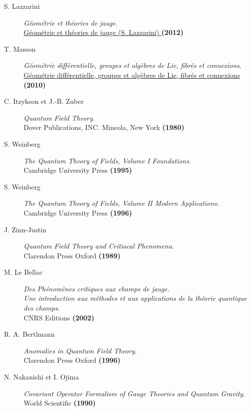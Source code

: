 \documentclass[a4paper,11pt]{article}
\theoremstyle{plain}
\theoremstyle{definition}
\theoremstyle{remark}
\numberwithin{equation}{section}
\numberwithin{equation}{subsection}
\numberwithin{figure}{section}
\begin{document}
\begin{description}

\item[S. Lazzarini]\emph{Géométrie et théories de jauge}. \\
\href{http://marwww.in2p3.fr/Master_M2_P3TMA_Physique_Theorique_et_Mathematique_Physique_des_Particules_
et_Astrophysique/Programme/Specialites/GeoTheoriedeJauge.html}{Géométrie et théories de jauge (S. Lazzarini) }  \textbf{(2012)}

\item[T. Masson]\emph{Géométrie différentielle, groupes et algèbres de Lie, fibrés et connexions}. \\
\href{http://science.thilucmic.fr/spip.php?article12}{Géométrie différentielle, groupes et algèbres de Lie, fibrés et connexions}
 \textbf{(2010)}

\item[C. Itzykson et J.-B. Zuber]\emph{Quantum Field Theory}. \\
Dover Publications, INC. Mineola, New York \textbf{(1980)}

\item[S. Weinberg]\emph{The Quantum Theory of Fields, Volume I Foundations}. \\
Cambridge University Press \textbf{(1995)}

\item[S. Weinberg]\emph{The Quantum Theory of Fields, Volume II Modern Applications}. \\
Cambridge University Press \textbf{(1996)}

\item[J. Zinn-Justin]\emph{Quantum Field Theory and Critiacal Phenomena}. \\
Clarendon Press Oxford \textbf{(1989)}

\item[M. Le Bellac]\emph{Des Phénomènes critiques aux champs de jauge. \\ Une introduction aux méthodes et 
aux applications de la théorie quantique des champs}. \\
CNRS Editions \textbf{(2002)}

\item[R. A. Bertlmann]\emph{Anomalies in Quantum Field Theory}. \\
Clarendon Press Oxford  \textbf{(1996)}

\item[N. Nakanishi et I. Ojima]\emph{Covariant Operator Formalism of Gauge Theories and Quantum Gravity}. \\
World Scientific  \textbf{(1990)}


\end{description}
\end{document}
